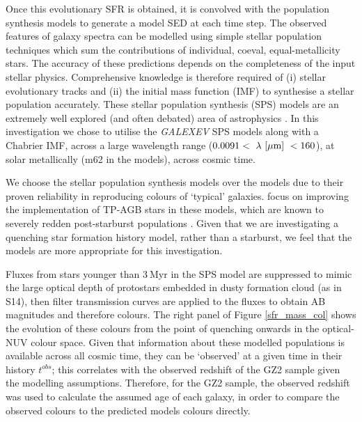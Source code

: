 \documentclass[useAMS,usenatbib]{mn2e}
\def\changed    {\color{titlecol} }
\begin{document}
Once this evolutionary SFR is obtained, it is convolved with the \citet{BC03} population synthesis models to generate a model SED at each time step. The observed features of galaxy spectra can be modelled using simple stellar population techniques which sum the contributions of individual, coeval, equal-metallicity stars. The accuracy of these predictions depends on the completeness of the input stellar physics. Comprehensive knowledge is therefore required of (i) stellar evolutionary tracks and (ii) the initial mass function (IMF) to synthesise a stellar population accurately. These stellar population synthesis (SPS) models are an extremely well explored (and often debated) area of astrophysics \citep{Maraston05, Eminian08, CGW09, Falk09, Chen10, Kriek10, MRC11, Mel12}. In this investigation we chose to utilise the \citet{BC03} \emph{GALEXEV} SPS models along with a Chabrier \citep{Chab03} IMF, across a large wavelength range ($0.0091 < ~\lambda~\rm{[\mu m]}~ < 160 $), at solar metallically (m62 in the \citet{BC03} models), across cosmic time.

We choose the \citet{BC03} stellar population synthesis models over the \citet{Maraston05} models due to their proven reliability in reproducing colours of `typical' galaxies. \citet{Maraston05} focus on improving the implementation of TP-AGB stars in these models, which are known to severely redden post-starburst populations \citep{MG07, Kriek10}. Given that we are investigating a quenching star formation history model, rather than a starburst, we feel that the \citet{BC03} models are more appropriate for this investigation. 

Fluxes from stars younger than $3~$Myr in the SPS model are suppressed to mimic the large optical depth of protostars embedded in dusty formation cloud (as in S14), then filter transmission curves are applied to the fluxes to obtain AB magnitudes and therefore colours. The right panel of Figure \ref{sfr_mass_col} shows the evolution of these colours from the point of quenching onwards in the optical-NUV colour space. {\changed Given that information about these modelled populations is available across all cosmic time, they can be `observed' at a given time in their history $t^{obs}$; this correlates with the observed redshift of the GZ2 sample given the modelling assumptions.} Therefore, for the GZ2 sample, the observed redshift was used to calculate the assumed age of each galaxy, in order to compare the observed colours to the predicted models colours directly. 
\end{document}
